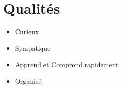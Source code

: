 \documentclass{article}
\begin{document}
\section{\Large Qualités}
\begin{itemize}
  \item Curieux
  \item Sympatique
  \item Apprend et Comprend rapidement
  \item Organisé
\end{itemize}
\end{document}
